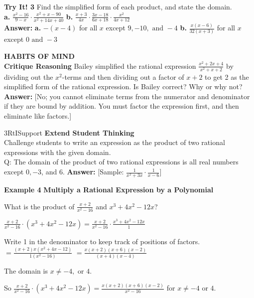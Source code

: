 \documentclass{article}
\newenvironment{concept-box}{}{}
\newenvironment{example}[1]{\textbf{Example #1}}{}
\newenvironment{tryit}[1]{\textbf{Try It! #1}}{}
\newenvironment{te-addendum}[2]{\textbf{TE (#1 - #2)}}{}
\newcommand{\answer}[1]{\textbf{Answer:} #1}
\begin{document}
\begin{tryit}{3}
Find the simplified form of each product, and state the domain. \\
\textbf{a.} $\frac{x^2 - 16}{9 - x} \cdot \frac{x^2 + x - 90}{x^2 + 14x + 40}$ \qquad \textbf{b.} $\frac{x+3}{4x} \cdot \frac{3x - 18}{6x + 18} \cdot \frac{x^2}{4x + 12}$ \\
\answer{\textbf{a.} $-(x - 4)$ for all $x$ except $9, -10, \text{ and } -4$ \qquad \textbf{b.} $\frac{x(x-6)}{32(x+3)}$ for all $x$ except $0 \text{ and } -3$}
\end{tryit}

\begin{concept-box}
\textbf{HABITS OF MIND} \\
\textbf{Critique Reasoning} Bailey simplified the rational expression $\frac{x^2 + 2x + 4}{x^2 + x + 2}$ by dividing out the $x^2$-terms and then dividing out a factor of $x+2$ to get 2 as the simplified form of the rational expression. Is Bailey correct? Why or why not? \\
\answer{[No; you cannot eliminate terms from the numerator and denominator if they are bound by addition. You must factor the expression first, and then eliminate like factors.]}
\end{concept-box}

\begin{te-addendum}{3}{RtISupport}
\textbf{Extend Student Thinking} \\
Challenge students to write an expression as the product of two rational expressions with the given domain. \\
Q: The domain of the product of two rational expressions is all real numbers except $0, -3$, and $6$.
\answer{[Sample: $\frac{1}{x^2 + 3x} \cdot \frac{1}{x - 6}$]}
\end{te-addendum}

\begin{example}{4}
\textbf{Multiply a Rational Expression by a Polynomial}

What is the product of $\frac{x+2}{x^2 - 16}$ and $x^3 + 4x^2 - 12x$?

$\frac{x+2}{x^2 - 16} \cdot (x^3 + 4x^2 - 12x) = \frac{x+2}{x^2 - 16} \cdot \frac{x^3 + 4x^2 - 12x}{1}$

Write 1 in the denominator to keep track of positions of factors.
$= \frac{(x+2)x(x^2 + 4x - 12)}{1(x^2 - 16)}$
$= \frac{x(x+2)(x+6)(x-2)}{(x+4)(x-4)}$

The domain is $x \neq -4, \text{ or } 4$.

So $\frac{x+2}{x^2 - 16} \cdot (x^3 + 4x^2 - 12x) = \frac{x(x+2)(x+6)(x-2)}{x^2 - 16}$ for $x \neq -4 \text{ or } 4$.
\end{example}
\end{document}
